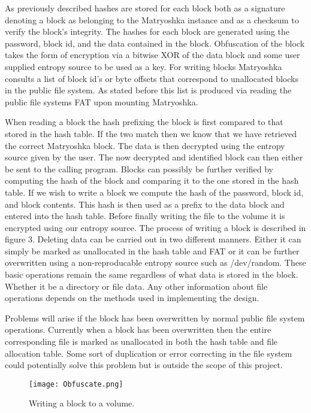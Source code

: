 \documentclass{article}
\begin{document}
\begin{multicols}{2}
As previously described hashes are stored for each block both as a signature denoting a block as belonging to the Matryoshka instance and as a checksum to verify the block's integrity. The hashes for each block are generated using the password, block id, and the data contained in the block. Obfuscation of the block takes the form of encryption via a bitwise XOR of the data block and some user supplied entropy source to be used as a key. For writing blocks Matryoshka consults a list of block id's or byte offsets that correspond to unallocated blocks in the public file system. As stated before this list is produced via reading the public file systems FAT upon mounting Matryoshka.

When reading a block the hash prefixing the block is first compared to that stored in the hash table. If the two match then we know that we have retrieved the correct Matryoshka block. The data is then decrypted using the entropy source given by the user. The now decrypted and identified block can then either be sent to the calling program. Blocks can possibly be further verified by computing the hash of the block and comparing it to the one stored in the hash table. If we wish to write a block we compute the hash of the password, block id, and block contents. This hash is then used as a prefix to the data block and entered into the hash table. Before finally writing the file to the volume it is encrypted using our entropy source. The process of writing a block is described in figure 3. Deleting data can be carried out in two different manners. Either it can simply be marked as unallocated in the hash table and FAT or it can be further overwritten using a non-reproducable entropy source such as /dev/random. These basic operations remain the same regardless of what data is stored in the block. Whether it be a directory or file data. Any other information about file operations depends on the methods used in implementing the design.


Problems will arise if the block has been overwritten by normal public file system operations. Currently when a block has been overwritten then the entire corresponding file is marked as unallocated in both the hash table and file allocation table. Some sort of duplication or error correcting in the file system could potentially solve this problem but is outside the scope of this project.

\begin{figure*}
  \centering
  \texttt{[image: Obfuscate.png]}
  \caption{Writing a block to a volume.}
  \label{fig:design3}
\end{figure*}


\end{multicols}
\end{document}
